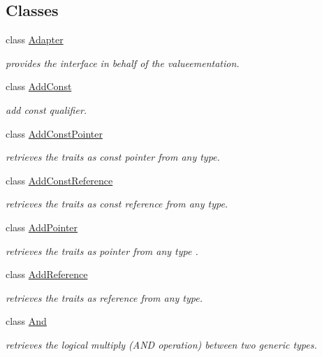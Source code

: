 \subsection*{Classes}
\begin{DoxyCompactItemize}
\item 
class \hyperlink{classhryky_1_1_adapter}{Adapter}
\begin{DoxyCompactList}\small\item\em provides the interface in behalf of the valueementation. \end{DoxyCompactList}\item 
class \hyperlink{classhryky_1_1_add_const}{Add\-Const}
\begin{DoxyCompactList}\small\item\em add const qualifier. \end{DoxyCompactList}\item 
class \hyperlink{classhryky_1_1_add_const_pointer}{Add\-Const\-Pointer}
\begin{DoxyCompactList}\small\item\em retrieves the traits as const pointer from any type. \end{DoxyCompactList}\item 
class \hyperlink{classhryky_1_1_add_const_reference}{Add\-Const\-Reference}
\begin{DoxyCompactList}\small\item\em retrieves the traits as const reference from any type. \end{DoxyCompactList}\item 
class \hyperlink{classhryky_1_1_add_pointer}{Add\-Pointer}
\begin{DoxyCompactList}\small\item\em retrieves the traits as pointer from any type . \end{DoxyCompactList}\item 
class \hyperlink{classhryky_1_1_add_reference}{Add\-Reference}
\begin{DoxyCompactList}\small\item\em retrieves the traits as reference from any type. \end{DoxyCompactList}\item 
class \hyperlink{classhryky_1_1_and}{And}
\begin{DoxyCompactList}\small\item\em retrieves the logical multiply (A\-N\-D operation) between two generic types. \end{DoxyCompactList}\item 

\end{DoxyCompactItemize}
